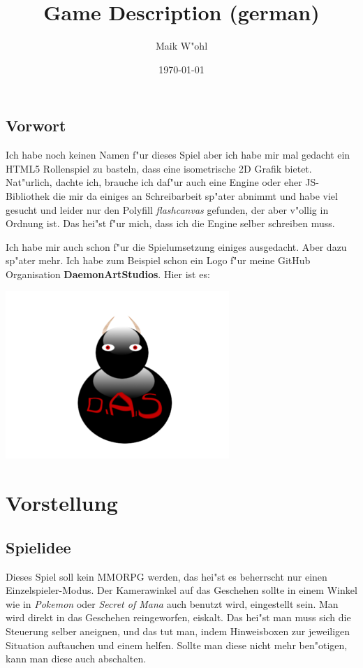 \documentclass[14pt]{book}
\title{Game Description (german)}
\author{Maik W"ohl}
\date{\today}
\begin{document}
\maketitle

\tableofcontents

\chapter*{Vorwort}

Ich habe noch keinen Namen f"ur dieses Spiel aber ich habe mir mal gedacht ein HTML5 Rollenspiel zu basteln, dass eine isometrische 2D Grafik bietet. Nat"urlich, dachte ich, brauche ich daf"ur auch eine Engine oder eher JS-Bibliothek die mir da einiges an Schreibarbeit sp"ater abnimmt und habe viel gesucht und leider nur den Polyfill \emph{flashcanvas} gefunden, der aber v"ollig in Ordnung ist. Das hei"st f"ur mich, dass ich die Engine selber schreiben muss.

Ich habe mir auch schon f"ur die Spielumsetzung einiges ausgedacht. Aber dazu sp"ater mehr. Ich habe zum Beispiel schon ein Logo f"ur meine GitHub Organisation \textbf{DaemonArtStudios}. Hier ist es:

\includegraphics{logo-das-small}

\part{Vorstellung}

\chapter{Spielidee}

Dieses Spiel soll kein MMORPG werden, das hei"st es beherrscht nur einen Einzelspieler-Modus. Der Kamerawinkel auf das Geschehen sollte in einem Winkel wie in \emph{Pokemon} oder \emph{Secret of Mana} auch benutzt wird, eingestellt sein. Man wird direkt in das Geschehen reingeworfen, eiskalt. Das hei"st man muss sich die Steuerung selber aneignen, und das tut man, indem Hinweisboxen zur jeweiligen Situation auftauchen und einem helfen. Sollte man diese nicht mehr ben"otigen, kann man diese auch abschalten.
\end{document}
